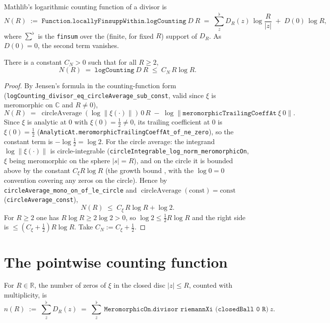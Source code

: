 Mathlib's logarithmic counting function of a divisor is
\[
  N(R)\;:=\;\texttt{Function.locallyFinsuppWithin.logCounting}\ D\ R
  \;=\;\sum_{z}^{\flat} D_R(z)\,\log\!\frac{R}{|z|}\;+\;D(0)\,\log R,
\]
where $\sum^{\flat}$ is the \texttt{finsum} over the (finite, for fixed $R$) support of
$D_R$. As $D(0)=0$, the second term vanishes.

\begin{lemma}
\label{lem:zs_jensen}
\leanok
{}
There is a constant $C_N>0$ such that for all $R\ge2$,
\[
  N(R)\;=\;\texttt{logCounting}\ D\ R\;\le\;C_N\,R\log R .
\]
\end{lemma}

\begin{proof}
\leanok
{}
By Jensen's formula in the counting-function form
(\texttt{logCounting\_divisor\_eq\_circleAverage\_sub\_const}, valid since $\xi$ is
meromorphic on $\mathbb C$ and $R\neq0$),
\[
  N(R)\;=\;\operatorname{circleAverage}(\log\|\xi(\cdot)\|)\,0\,R
          \;-\;\log\|\texttt{meromorphicTrailingCoeffAt}\ \xi\ 0\|.
\]
Since $\xi$ is analytic at $0$ with $\xi(0)=\tfrac12\neq0$, its trailing coefficient at
$0$ is $\xi(0)=\tfrac12$ (\texttt{AnalyticAt.meromorphicTrailingCoeffAt\_of\_ne\_zero}),
so the constant term is $-\log\tfrac12=\log2$. For the circle average: the integrand
$\log\|\xi(\cdot)\|$ is circle-integrable (\texttt{circleIntegrable\_log\_norm\_meromorphicOn},
$\xi$ being meromorphic on the sphere $|s|=R$), and on the circle it is bounded above by
the constant $C_\xi R\log R$ (the growth bound , with the $\log0=0$
convention covering any zeros on the circle). Hence by
\texttt{circleAverage\_mono\_on\_of\_le\_circle} and
$\operatorname{circleAverage}(\text{const})=\text{const}$
(\texttt{circleAverage\_const}),
\[
  N(R)\;\le\;C_\xi\,R\log R+\log2 .
\]
For $R\ge2$ one has $R\log R\ge2\log2>0$, so $\log2\le\tfrac12 R\log R$ and the right side
is $\le(C_\xi+\tfrac12)R\log R$. Take $C_N:=C_\xi+\tfrac12$.
\end{proof}

\section{The pointwise counting function}
\label{sec:zs_count}

\begin{definition}
\label{def:zs_count}
\leanok
For $R\in\mathbb R$, the number of zeros of $\xi$ in the closed disc $|z|\le R$, counted
with multiplicity, is
\[
  n(R)\;:=\;\sum_{z}^{\flat} D_R(z)
        \;=\;\sum_{z}^{\flat}\ \texttt{MeromorphicOn.divisor riemannXi (closedBall 0\ R)}\ z .
\]
\end{definition}

